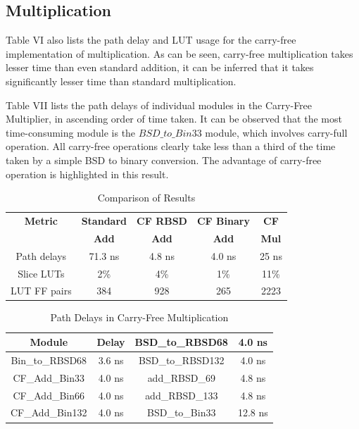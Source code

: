 \documentclass[conference]{IEEEtran_NCC}
\begin{document}
\subsection{Multiplication}

Table VI also lists the path delay and LUT usage for the carry-free implementation of multiplication. As can be seen, carry-free multiplication takes lesser time than even standard addition, it can be inferred that it takes significantly lesser time than standard multiplication.

Table VII lists the path delays of individual modules in the Carry-Free Multiplier, in ascending order of time taken. It can be observed that the most time-consuming module is the $BSD\_to\_Bin33$ module, which involves carry-full operation. All carry-free operations clearly take less than a third of the time taken by a simple BSD to binary conversion. The advantage of carry-free operation is highlighted in this result.

\begin{table}[h!]
  \centering
  \caption{Comparison of Results}
  \label{tab:table6}
  \begin{tabular}{|c|c|c|c|c|}
    \hline
    \textbf{Metric} & \textbf{Standard} & \textbf{CF RBSD} & \textbf{CF Binary} & \textbf{CF} \\
    & \textbf{Add} & \textbf{Add} & \textbf{Add} & \textbf{Mul} \\
    \hline
    \hline
    Path delays & 71.3 ns & 4.8 ns & 4.0 ns & 25 ns \\
    \hline
    Slice LUTs & 2\% & 4\% & 1\% & 11\% \\
    \hline
    LUT FF pairs & 384 & 928 & 265 & 2223 \\
    \hline
  \end{tabular}
\end{table}

\begin{table}[h!]
  \centering
  \caption{Path Delays in Carry-Free Multiplication}
  \label{tab:table7}
  \begin{tabular}{|c|c||c|c|}
    \hline
    \textbf{Module} & \textbf{Delay} & BSD\_to\_RBSD68 & 4.0 ns \\
    \hline
    Bin\_to\_RBSD68 & 3.6 ns & BSD\_to\_RBSD132 & 4.0 ns \\
    \hline
    CF\_Add\_Bin33 & 4.0 ns & add\_RBSD\_69 & 4.8 ns \\
    \hline
    CF\_Add\_Bin66 & 4.0 ns & add\_RBSD\_133 & 4.8 ns \\
    \hline
    CF\_Add\_Bin132 & 4.0 ns & BSD\_to\_Bin33 & 12.8 ns \\
    \hline
  \end{tabular}
\end{table}
\end{document}
